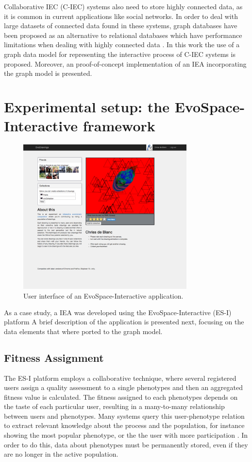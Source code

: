 \documentclass[conference]{IEEEtran}
\begin{document}
Collaborative IEC (C-IEC) systems also need to store highly connected data, as it is common in current applications
like social networks. In order to deal with large datasets of connected data found in these systems,
graph databases \cite{angles2012comparison} have been proposed as an alternative to relational databases 
which have performance limitations when dealing with highly connected data \cite{holzschuher2013performance}.
In this work the use of a graph data model for representing the interactive process of C-IEC systems is proposed.
Moreover, an proof-of-concept implementation of an IEA incorporating the graph model is presented.

\section{Experimental setup: the EvoSpace-Interactive framework}
\label{sec:evospace-i}
\begin{figure}[!t]
    \centering
        \includegraphics[width=3.5in]{img/UI_ed01.png}
    \caption{User interface of an EvoSpace-Interactive application.}
    \label{fig:web}
\end{figure}

As a case study, a IEA was developed using the 
EvoSpace-Interactive (ES-I) platform \cite{garcia2013evospace}
A brief description of the application is presented next, focusing
on the data elements that where ported to the graph model.

\subsection{Fitness Assignment}
\label{sec:assignment}
The ES-I platform employs a collaborative technique,
where several registered users assign a quality assessment to a single
phenotypes and then an aggregated fitness value is calculated. The fitness
assigned to each phenotypes depends on the taste of each particular user, 
resulting in a many-to-many relationship between users and phenotypes. 
Many systems query this user-phenotype relation to extract relevant
knowledge about the process and the population, for instance showing the
most popular phenotype, or the the user with more participation 
\cite{picbreeder}.
In order to do this, data about phenotypes 
must be permanently stored, even
if they are no longer in the active population. 
\end{document}
